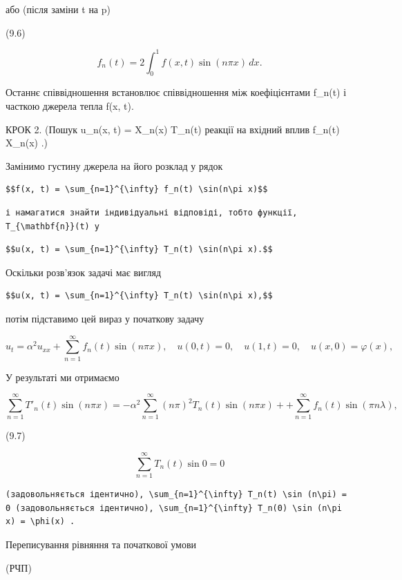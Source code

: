 \documentclass[
  ukrainian,
]{article}
\begin{document}
або (після заміни t на p)

(9.6)

\[
f_{n}(t) = 2 \int_{0}^{1} f(x, t) \sin(n\pi x)\,dx.
\]

Останнє співвідношення встановлює співвідношення між коефіцієнтами
f\_n(t) і часткою джерела тепла f(x, t).

КРОК 2. (Пошук u\_n(x, t) = X\_n(x) T\_n(t) реакції на вхідний вплив
f\_n(t) X\_n(x) .)

Замінимо густину джерела на його розклад у рядок

\begin{verbatim}
$$f(x, t) = \sum_{n=1}^{\infty} f_n(t) \sin(n\pi x)$$
\end{verbatim}

\begin{verbatim}
і намагатися знайти індивідуальні відповіді, тобто функції, T_{\mathbf{n}}(t) у
\end{verbatim}

\begin{verbatim}
$$u(x, t) = \sum_{n=1}^{\infty} T_n(t) \sin(n\pi x).$$
\end{verbatim}

Оскільки розв'язок задачі має вигляд

\begin{verbatim}
$$u(x, t) = \sum_{n=1}^{\infty} T_n(t) \sin(n\pi x),$$
\end{verbatim}

потім підставимо цей вираз у початкову задачу

\[
u_{t} = \alpha^{2} u_{xx} + \sum_{n=1}^{\infty} f_{n}(t) \sin(n\pi x),
\quad u(0, t) = 0, \quad u(1, t) = 0, \quad u(x, 0) = \varphi(x),
\]

У результаті ми отримаємо

\[
\sum_{n=1}^{\infty} T'_n(t) \sin(n\pi x) = -\alpha^2 \sum_{n=1}^{\infty} (n\pi)^2 T_n(t) \sin(n\pi x) + + \sum_{n=1}^{\infty} f_n(t) \sin(\pi n\lambda),
\]

(9.7)

\[
\sum_{n=1}^{\infty} T_n(t) \sin 0 = 0
\]

\begin{verbatim}
(задовольняється ідентично), \sum_{n=1}^{\infty} T_n(t) \sin (n\pi) = 0 (задовольняється ідентично), \sum_{n=1}^{\infty} T_n(0) \sin (n\pi x) = \phi(x) .
\end{verbatim}

Переписування рівняння та початкової умови

(РЧП)
\end{document}
